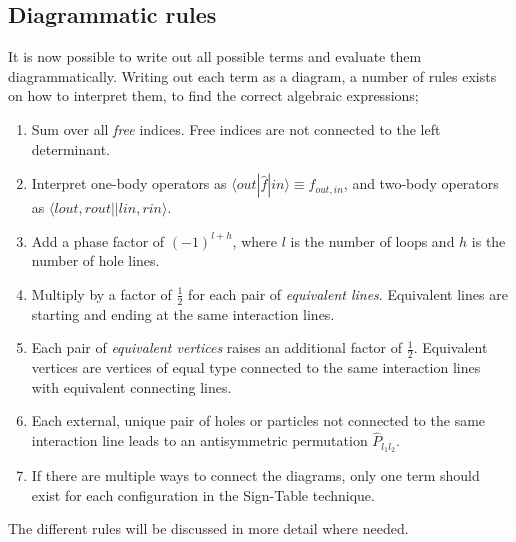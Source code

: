 \subsection{Diagrammatic rules}
It is now possible to write out all possible terms and evaluate them diagrammatically. 
Writing out each term as a diagram, a number of rules exists on how to interpret them, to find the correct algebraic expressions;
\begin{enumerate}
\item\label{ite:CC:sumFree} Sum over all \textit{free} indices. Free indices are not connected to the left determinant.
\item\label{ite:CC:operators} Interpret one-body operators as $\langle out |\hat{f}| in \rangle \equiv f_{out,in}$, and two-body operators as $\langle lout,rout || lin,rin \rangle$.
\item\label{ite:CC:phase} Add a phase factor of $(-1)^{l+h}$, where $l$ is the number of loops and $h$ is the number of hole lines.
\item\label{ite:CC:equLines} Multiply by a factor of $\frac{1}{2}$ for each pair of \textit{equivalent lines}.
Equivalent lines are starting and ending at the same interaction lines.
\item\label{ite:CC:equVert} Each pair of \textit{equivalent vertices} raises an additional factor of $\frac{1}{2}$.
Equivalent vertices are vertices of equal type connected to the same interaction lines with equivalent connecting lines.
\item\label{ite:CC:permut} Each external, unique pair of holes or particles not connected to the same interaction line leads to an antisymmetric permutation $\hat{P}_{l_1 l_2}$.
\item\label{ite:CC:signTable} If there are multiple ways to connect the diagrams, only one term should exist for each configuration in the Sign-Table technique.
\end{enumerate}
The different rules will be discussed in more detail where needed.

